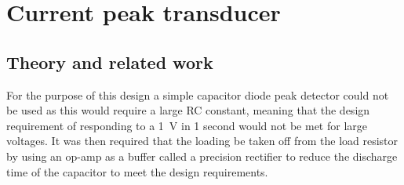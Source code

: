 \chapter{Current peak transducer}
\section{Theory and related work} \label{sec:literature_current_peak_transducer}
For the purpose of this design a simple capacitor diode peak detector could not be used as this would require a large RC constant, meaning that the design requirement of responding to a \SI{1}{V} in 1 second would not be met for large voltages. It was then required that the loading be taken off from the load resistor by using an op-amp as a buffer called a precision rectifier to reduce the discharge time of the capacitor to meet the design requirements. 

